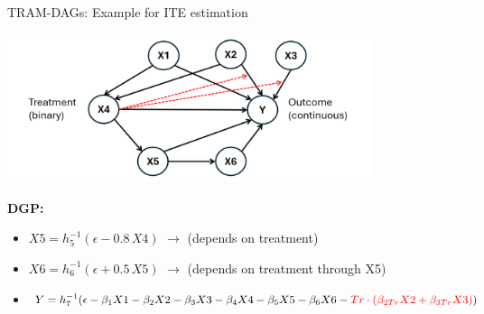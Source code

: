 \documentclass[onlytextwidth,english]{beamer}\usepackage[]{graphicx}\usepackage[]{xcolor}
\begin{document}
\begin{frame}{TRAM-DAGs: Example for ITE estimation}

\centering
\includegraphics[width=0.8\textwidth]{img/dag_ITE_observational.png}
\normalsize

\vspace{1em} %
\raggedright %

\small
\textbf{DGP:}
\begin{itemize}
    \item $X5 = h_5^{-1}(\epsilon - 0.8 \, X4 )$ \hspace{1em} $\rightarrow$ (depends on treatment)
    \item $X6 = h_6^{-1}(\epsilon + 0.5 \, X5)$ \hspace{1em} $\rightarrow$ (depends on treatment through X5)
    \item $Y = h_7^{-1}(\epsilon - \beta_1 X1 - \beta_2 X2 - \beta_3 X3 - \beta_4 X4 - \beta_5 X5 - \beta_6 X6 - \textcolor{red}{Tr \cdot (\beta_{2Tr} X2 + \beta_{3Tr} X3)})$
\end{itemize}

\end{frame}






% 
% 
% 
% 
% 
\end{document}
